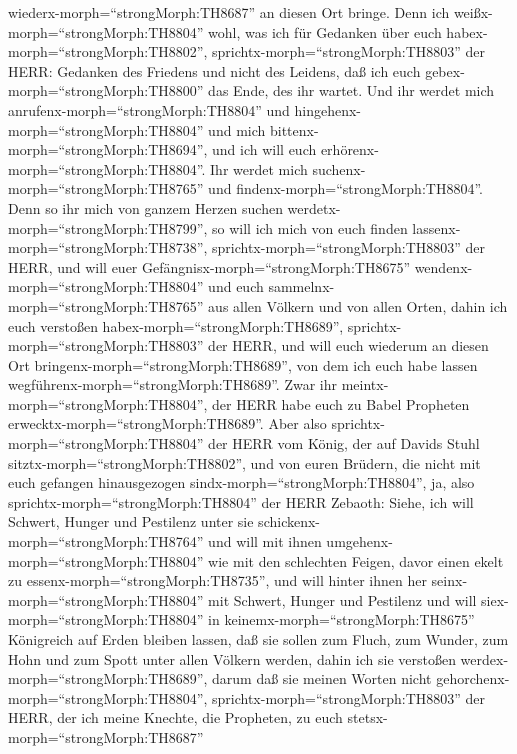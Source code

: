 wiederx-morph=``strongMorph:TH8687'' an diesen Ort bringe. 
Denn ich weißx-morph=``strongMorph:TH8804'' wohl, was ich für Gedanken
über euch habex-morph=``strongMorph:TH8802'',
sprichtx-morph=``strongMorph:TH8803'' der HERR: Gedanken des Friedens
und nicht des Leidens, daß ich euch gebex-morph=``strongMorph:TH8800''
das Ende, des ihr wartet.  Und ihr werdet mich
anrufenx-morph=``strongMorph:TH8804'' und
hingehenx-morph=``strongMorph:TH8804'' und mich
bittenx-morph=``strongMorph:TH8694'', und ich will euch
erhörenx-morph=``strongMorph:TH8804''.  Ihr werdet mich
suchenx-morph=``strongMorph:TH8765'' und
findenx-morph=``strongMorph:TH8804''. Denn so ihr mich von ganzem Herzen
suchen werdetx-morph=``strongMorph:TH8799'',  so will ich
mich von euch finden lassenx-morph=``strongMorph:TH8738'',
sprichtx-morph=``strongMorph:TH8803'' der HERR, und will euer
Gefängnisx-morph=``strongMorph:TH8675''
wendenx-morph=``strongMorph:TH8804'' und euch
sammelnx-morph=``strongMorph:TH8765'' aus allen Völkern und von allen
Orten, dahin ich euch verstoßen habex-morph=``strongMorph:TH8689'',
sprichtx-morph=``strongMorph:TH8803'' der HERR, und will euch wiederum
an diesen Ort bringenx-morph=``strongMorph:TH8689'', von dem ich euch
habe lassen wegführenx-morph=``strongMorph:TH8689''.  Zwar
ihr meintx-morph=``strongMorph:TH8804'', der HERR habe euch zu Babel
Propheten erwecktx-morph=``strongMorph:TH8689''.  Aber also
sprichtx-morph=``strongMorph:TH8804'' der HERR vom König, der auf Davids
Stuhl sitztx-morph=``strongMorph:TH8802'', und von euren Brüdern, die
nicht mit euch gefangen hinausgezogen
sindx-morph=``strongMorph:TH8804'',  ja, also
sprichtx-morph=``strongMorph:TH8804'' der HERR Zebaoth: Siehe, ich will
Schwert, Hunger und Pestilenz unter sie
schickenx-morph=``strongMorph:TH8764'' und will mit ihnen
umgehenx-morph=``strongMorph:TH8804'' wie mit den schlechten Feigen,
davor einen ekelt zu essenx-morph=``strongMorph:TH8735'', 
und will hinter ihnen her seinx-morph=``strongMorph:TH8804'' mit
Schwert, Hunger und Pestilenz und will siex-morph=``strongMorph:TH8804''
in keinemx-morph=``strongMorph:TH8675'' Königreich auf Erden bleiben
lassen, daß sie sollen zum Fluch, zum Wunder, zum Hohn und zum Spott
unter allen Völkern werden, dahin ich sie verstoßen
werdex-morph=``strongMorph:TH8689'',  darum daß sie meinen
Worten nicht gehorchenx-morph=``strongMorph:TH8804'',
sprichtx-morph=``strongMorph:TH8803'' der HERR, der ich meine Knechte,
die Propheten, zu euch stetsx-morph=``strongMorph:TH8687''
